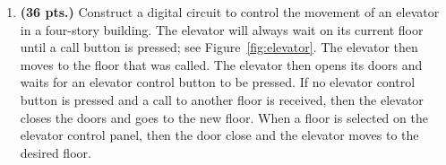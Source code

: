 \begin{enumerate}
\begin{solution}
{The memory input equations are a snap.  

}\end{solution}


\item {\bf (36 pts.)}
Construct a digital circuit to control the movement of an elevator
in a four-story building.  The elevator will always wait on its current floor
until a call button is pressed; see Figure~\ref{fig:elevator}.  The elevator
then moves to the floor that was called.  The elevator then opens its doors and
waits for an elevator control button to be pressed.  If no elevator control
button is pressed and a call to another floor is received, then the elevator
closes the doors and goes to the new floor.  When a floor is selected on the
elevator control panel, then the door close and the elevator moves to the
desired floor.


\end{enumerate}
